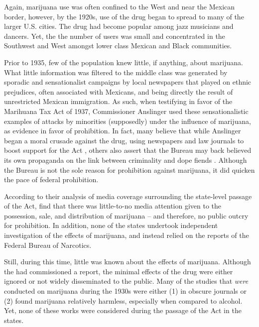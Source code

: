 Again, marijuana use was often confined to the West and near the Mexican border, however, by the 1920s, use of the drug began to spread to many of the larger U.S. cities. The drug had become popular among jazz musicians and dancers. Yet, the the number of users was small and concentrated in the Southwest and West amongst lower class Mexican and Black communities. 

Prior to 1935, few of the population knew little, if anything, about marijuana. What little information was filtered to the middle class was generated by sporadic and sensationalist campaigns by local newspapers that played on ethnic prejudices, often associated with Mexicans, and being directly the result of unrestricted Mexican immigration\citep{bonnie_and_whitebread_1970}. As such, when testifying in favor of the Marihuana Tax Act of 1937, Commissioner Anslinger used these sensationalistic examples of attacks by minorities (supposedly) under the influence of marijuana, as evidence in favor of prohibition. In fact, many believe that while Anslinger began a moral crusade against the drug, using newspapers and law journals to boost support for the Act \citep{anslinger_1932}, others also assert that the Bureau may back believed its own propaganda on the link between criminality and dope fiends \citep{king_1953}. Although the Bureau is not the sole reason for prohibition against marijuana, it did quicken the pace of federal prohibition. 

According to their analysis of media coverage surrounding the state-level passage of the Act, \citet{bonnie_and_whitebread_1970} find that there was little-to-no media attention given to the possession, sale, and distribution of marijuana -- and therefore, no public outcry for prohibition. In addition, none of the states undertook independent investigation of the effects of marijuana, and instead relied on the reports of the Federal Bureau of Narcotics. 

Still, during this time, little was known about the effects of marijuana. Although the \citet{hemp_1894} had commissioned a report, the minimal effects of the drug were either ignored or not widely disseminated to the public. Many of the studies that \textit{were} conducted on marijuana during the 1930s were either (1) in obscure journals or (2) found marijuana relatively harmless, especially when compared to alcohol. Yet, none of these works were considered during the passage of the Act in the states. 

